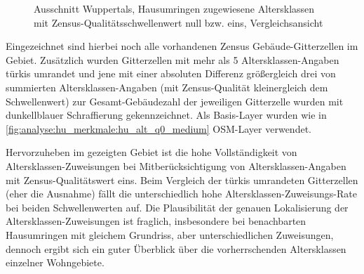 		\begin{figure}[h]
			\centering
			\caption{Ausschnitt Wuppertals, Hausumringen zugewiesene Altersklassen mit Zensus-Qualitätsschwellenwert null bzw. eins, Vergleichsansicht}
			\label{fig:analyse:hu_merkmale:hu_alt_q0_q1}
		\end{figure}

		Eingezeichnet sind hierbei noch alle vorhandenen Zensus Gebäude-Gitterzellen im Gebiet. Zusätzlich wurden Gitterzellen mit mehr als 5 Altersklassen-Angaben türkis umrandet und jene mit einer absoluten Differenz größergleich drei von summierten Altersklassen-Angaben (mit Zensus-Qualität kleinergleich dem Schwellenwert) zur Gesamt-Gebäudezahl der jeweiligen Gitterzelle wurden mit dunkellblauer Schraffierung gekennzeichnet. Als Basis-Layer wurden wie in \autoref{fig:analyse:hu_merkmale:hu_alt_q0_medium} OSM-Layer verwendet.
		
		Hervorzuheben im gezeigten Gebiet ist die hohe Vollständigkeit von Altersklassen-Zuweisungen bei Mitberücksichtigung von Altersklassen-Angaben mit Zensus-Qualitätswert eins. Beim Vergleich der türkis umrandeten Gitterzellen (eher die Ausnahme) fällt die unterschiedlich hohe Altersklassen-Zuweisungs-Rate bei beiden Schwellenwerten auf. Die Plausibilität der genauen Lokalisierung der Altersklassen-Zuweisungen ist fraglich, insbesondere bei benachbarten Hausumringen mit gleichem Grundriss, aber unterschiedlichen Zuweisungen, dennoch ergibt sich ein guter Überblick über die vorherrschenden Altersklassen einzelner Wohngebiete.
		
